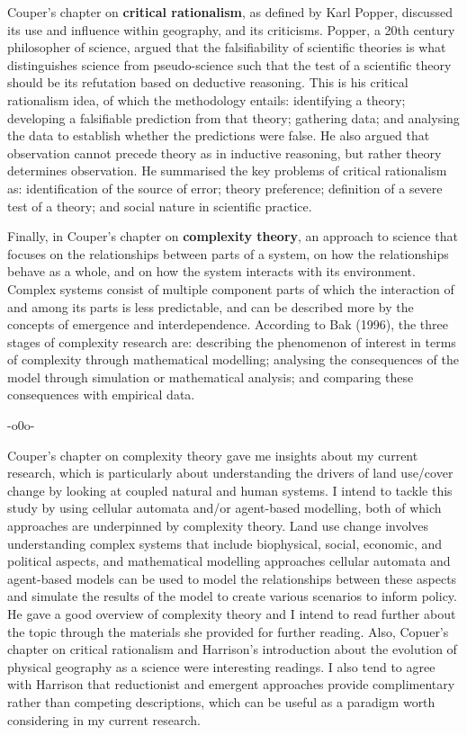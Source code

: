 \documentclass[a4paper, 10.5pt]{article} %
\begin{document}
Couper's chapter on \textbf{critical rationalism}, as defined by Karl Popper, discussed its use and influence within geography, and its criticisms. Popper, a 20th century philosopher of science, argued that the falsifiability of scientific theories is what distinguishes science from pseudo-science such that the test of a scientific theory should be its refutation based on deductive reasoning. This is his critical rationalism idea, of which the methodology entails: identifying a theory; developing a falsifiable prediction from that theory; gathering data; and analysing the data to establish whether the predictions were false. He also argued that observation cannot precede theory as in inductive reasoning, but rather theory determines observation. He summarised the key problems of critical rationalism as: identification of the source of error; theory preference; definition of a severe test of a theory; and social nature in scientific practice.

Finally, in Couper's chapter on \textbf{complexity theory}, an approach to science that focuses on the relationships between parts of a system, on how the relationships behave as a whole, and on how the system interacts with its environment. Complex systems consist of multiple component parts of which the interaction of and among its parts is less predictable, and can be described more by the concepts of emergence and interdependence. According to Bak (1996), the three stages of complexity research are: describing the phenomenon of interest in terms of complexity through mathematical modelling; analysing the consequences of the model through simulation or mathematical analysis; and comparing these consequences with empirical data.

\begin{center}
-o0o-
\end{center}

Couper's chapter on complexity theory gave me insights about my current research, which is particularly about understanding the drivers of land use/cover change by looking at coupled natural and human systems. I intend to tackle this study by using cellular automata and/or agent-based modelling, both of which approaches are underpinned by complexity theory. Land use change involves understanding complex systems that include biophysical, social, economic, and political aspects, and mathematical modelling approaches cellular automata and agent-based models can be used to model the relationships between these aspects and simulate the results of the model to create various scenarios to inform policy. He gave a good overview of complexity theory and I intend to read further about the topic through the materials she provided for further reading. Also, Copuer's chapter on critical rationalism and Harrison's introduction about the evolution of physical geography as a science were interesting readings. I also tend to agree with Harrison that reductionist and emergent approaches provide complimentary rather than competing descriptions, which can be useful as a paradigm worth considering in my current research. 
\end{document}
